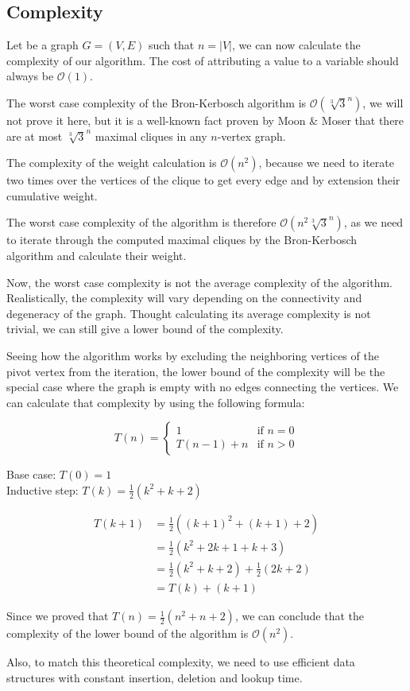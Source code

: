 \subsection{Complexity}

Let be a graph $G=(V,E)$ such that $n=|V|$, we can now calculate the complexity 
of our algorithm. The cost of attributing a value to a variable should
always be $\mathcal{O}(1)$. \bigskip

The worst case complexity of the Bron-Kerbosch algorithm is $\mathcal{O}(\sqrt[3]{3}^n)$,
we will not prove it here, but it is a well-known fact proven by Moon \& Moser
\cite{on-cliques-in-graphs} that there are at most $\sqrt[3]{3}^n$ maximal cliques
in any $n$-vertex graph. \bigskip

The complexity of the weight calculation is $\mathcal{O}(n^2)$, because we need
to iterate two times over the vertices of the clique to get every edge and by
extension their cumulative weight. \bigskip

The worst case complexity of the algorithm is therefore $\mathcal{O}(n^2\sqrt[3]{3}^n)$,
as we need to iterate through the computed maximal cliques by the Bron-Kerbosch
algorithm and calculate their weight. \bigskip

Now, the worst case complexity is not the average complexity of the algorithm.
Realistically, the complexity will vary depending on the connectivity and degeneracy 
of the graph. Thought calculating its average complexity is not trivial, we can 
still give a lower bound of the complexity. \bigskip

Seeing how the algorithm works by excluding the neighboring vertices of the pivot
vertex from the iteration, the lower bound of the complexity will be the special
case where the graph is empty with no edges connecting the vertices. We can
calculate that complexity by using the following formula:

\begin{equation}
    T(n)=\begin{cases}
        1        & \text{if } n=0 \\
        T(n-1)+n & \text{if } n>0
    \end{cases}
\end{equation}

Base case: $T(0)=1$ \\
Inductive step: $T(k)=\frac{1}{2}(k^2+k+2)$

\begin{align}
    T(k+1)&=\frac{1}{2}((k+1)^2+(k+1)+2)\\
    &=\frac{1}{2}(k^2+2k+1+k+3)\\
    &=\frac{1}{2}(k^2+k+2)+\frac{1}{2}(2k+2)\\
    &=T(k)+(k+1)
\end{align}

Since we proved that $T(n)=\frac{1}{2}(n^2+n+2)$, we can conclude that the complexity
of the lower bound of the algorithm is $\mathcal{O}(n^2)$. \bigskip

Also, to match this theoretical complexity, we need to use efficient data structures
with constant insertion, deletion and lookup time. \bigskip
